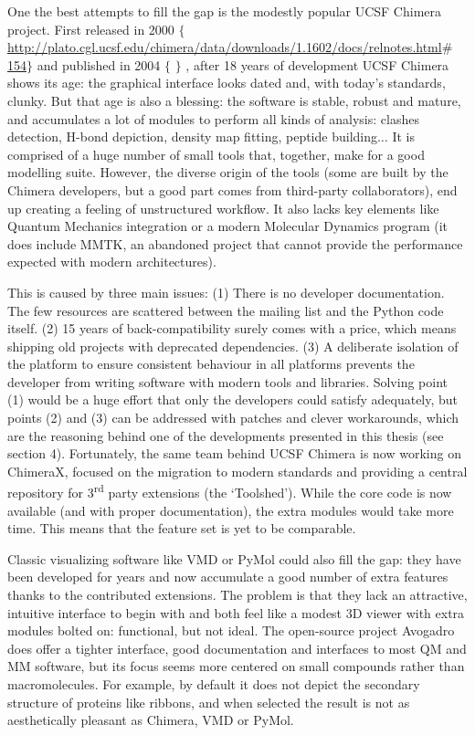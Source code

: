 One the best attempts to fill the gap is the modestly popular UCSF Chimera project. First released in 2000 $ \{ $  \href{http://plato.cgl.ucsf.edu/chimera/data/downloads/1.1602/docs/relnotes.html}{http://plato.cgl.ucsf.edu/chimera/data/downloads/1.1602/docs/relnotes.html$\#$ 154}$ \} $  and published in 2004 $ \{ $ $ \} $ , after 18 years of development UCSF Chimera shows its age: the graphical interface looks dated and, with today’s standards, clunky. But that age is also a blessing: the software is stable, robust and mature, and accumulates a lot of modules to perform all kinds of analysis: clashes detection, H-bond depiction, density map fitting, peptide building$ \ldots $  It is comprised of a huge number of small tools that, together, make for a good modelling suite. However, the diverse origin of the tools (some are built by the Chimera developers, but a good part comes from third-party collaborators), end up creating a feeling of unstructured workflow. It also lacks key elements like Quantum Mechanics integration or a modern Molecular Dynamics program (it does include MMTK, an abandoned project that cannot provide the performance expected with modern architectures).

This is caused by three main issues: (1) There is no developer documentation. The few resources are scattered between the mailing list and the Python code itself. (2) 15 years of back-compatibility surely comes with a price, which means shipping old projects with deprecated dependencies. (3) A deliberate isolation of the platform to ensure consistent behaviour in all platforms prevents the developer from writing software with modern tools and libraries. Solving point (1) would be a huge effort that only the developers could satisfy adequately, but points (2) and (3) can be addressed with patches and clever workarounds, which are the reasoning behind one of the developments presented in this thesis (see section 4). Fortunately, the same team behind UCSF Chimera is now working on ChimeraX, focused on the migration to modern standards and providing a central repository for 3\textsuperscript{rd} party extensions (the ‘Toolshed’). While the core code is now available (and with proper documentation), the extra modules would take more time. This means that the feature set is yet to be comparable.

Classic visualizing software like VMD or PyMol could also fill the gap: they have been developed for years and now accumulate a good number of extra features thanks to the contributed extensions. The problem is that they lack an attractive, intuitive interface to begin with and both feel like a modest 3D viewer with extra modules bolted on: functional, but not ideal. The open-source project Avogadro does offer a tighter interface, good documentation and interfaces to most QM and MM software, but its focus seems more centered on small compounds rather than macromolecules. For example, by default it does not depict the secondary structure of proteins like ribbons, and when selected the result is not as aesthetically pleasant as Chimera, VMD or PyMol.

